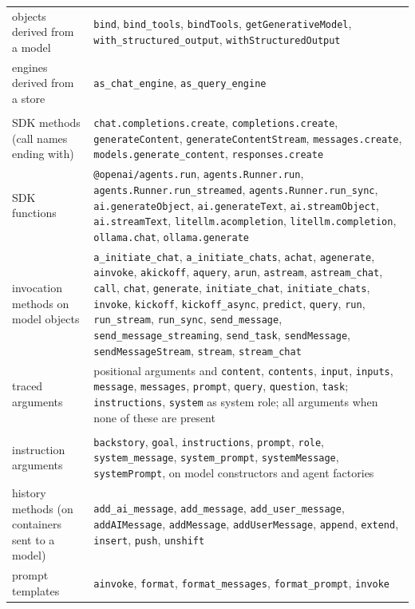 {\begin{longtable}{@{}>{\raggedright\arraybackslash}p{}>{\raggedright\arraybackslash}p{}@{}}
objects derived from a model & \texttt{bind}, \texttt{bind\_tools}, \texttt{bindTools}, \texttt{getGenerativeModel}, \texttt{with\_structured\_output}, \texttt{withStructuredOutput} \\
engines derived from a store & \texttt{as\_chat\_engine}, \texttt{as\_query\_engine} \\
\addlinespace[3pt]\multicolumn{2}{@{}l}{\emph{model call}} \\
SDK methods (call names ending with) & \texttt{chat.completions.create}, \texttt{completions.create}, \texttt{generateContent}, \texttt{generateContentStream}, \texttt{messages.create}, \texttt{models.generate\_content}, \texttt{responses.create} \\
SDK functions & \texttt{@openai/agents.run}, \texttt{agents.Runner.run}, \texttt{agents.Runner.run\_streamed}, \texttt{agents.Runner.run\_sync}, \texttt{ai.generateObject}, \texttt{ai.generateText}, \texttt{ai.streamObject}, \texttt{ai.streamText}, \texttt{litellm.acompletion}, \texttt{litellm.completion}, \texttt{ollama.chat}, \texttt{ollama.generate} \\
invocation methods on model objects & \texttt{a\_initiate\_chat}, \texttt{a\_initiate\_chats}, \texttt{achat}, \texttt{agenerate}, \texttt{ainvoke}, \texttt{akickoff}, \texttt{aquery}, \texttt{arun}, \texttt{astream}, \texttt{astream\_chat}, \texttt{call}, \texttt{chat}, \texttt{generate}, \texttt{initiate\_chat}, \texttt{initiate\_chats}, \texttt{invoke}, \texttt{kickoff}, \texttt{kickoff\_async}, \texttt{predict}, \texttt{query}, \texttt{run}, \texttt{run\_stream}, \texttt{run\_sync}, \texttt{send\_message}, \texttt{send\_message\_streaming}, \texttt{send\_task}, \texttt{sendMessage}, \texttt{sendMessageStream}, \texttt{stream}, \texttt{stream\_chat} \\
traced arguments & positional arguments and \texttt{content}, \texttt{contents}, \texttt{input}, \texttt{inputs}, \texttt{message}, \texttt{messages}, \texttt{prompt}, \texttt{query}, \texttt{question}, \texttt{task}; \texttt{instructions}, \texttt{system} as system role; all arguments when none of these are present \\
\addlinespace[3pt]\multicolumn{2}{@{}l}{\emph{instructions and history}} \\
instruction arguments & \texttt{backstory}, \texttt{goal}, \texttt{instructions}, \texttt{prompt}, \texttt{role}, \texttt{system\_message}, \texttt{system\_prompt}, \texttt{systemMessage}, \texttt{systemPrompt}, on model constructors and agent factories \\
history methods (on containers sent to a model) & \texttt{add\_ai\_message}, \texttt{add\_message}, \texttt{add\_user\_message}, \texttt{addAIMessage}, \texttt{addMessage}, \texttt{addUserMessage}, \texttt{append}, \texttt{extend}, \texttt{insert}, \texttt{push}, \texttt{unshift} \\
prompt templates & \texttt{ainvoke}, \texttt{format}, \texttt{format\_messages}, \texttt{format\_prompt}, \texttt{invoke} \\
\end{longtable}

}
